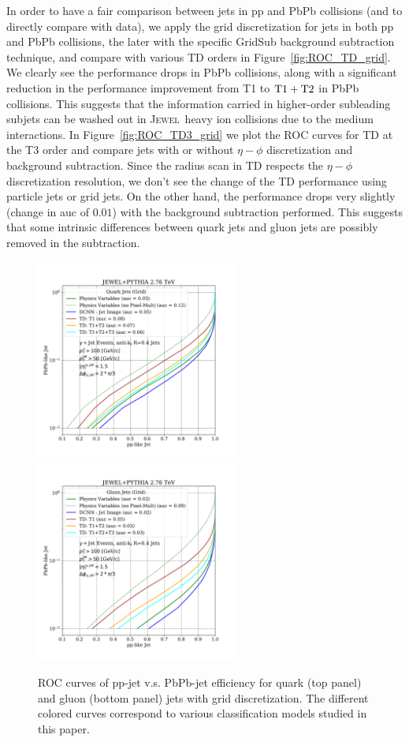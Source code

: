 \documentclass[notoc,preprintnumbers]{JHEP3}
\newcommand{\jw}{\textsc{Jewel}~}
\begin{document}
In order to have a fair comparison between jets in pp and PbPb collisions (and to directly compare with data), we apply the grid discretization for jets in both pp and PbPb collisions, the later with the specific GridSub background subtraction technique, and compare with various TD orders in Figure~\ref{fig:ROC_TD_grid}. We clearly see the performance drops in PbPb collisions, along with a significant reduction in the performance improvement from T1 to $\rm T1+T2$ in PbPb collisions. This suggests that the information carried in higher-order subleading subjets can be washed out in \jw heavy ion collisions due to the medium interactions. In Figure~\ref{fig:ROC_TD3_grid} we plot the ROC curves for TD at the T3 order and compare jets with or without $\eta-\phi$ discretization and background subtraction. Since the radius scan in TD respects the $\eta-\phi$ discretization resolution, we don't see the change of the TD performance using particle jets or grid jets. On the other hand, the performance drops very slightly (change in auc of $0.01$) with the background subtraction performed. This suggests that some intrinsic differences between quark jets and gluon jets are possibly removed in the subtraction.

\begin{figure}[t]
	   \centering
	   \includegraphics[width=0.59\textwidth]{plots/JEWELPYTHIA_2p76TeV_quark_ppvspbpb.pdf}
	   \includegraphics[width=0.59\textwidth]{plots/JEWELPYTHIA_2p76TeV_gluon_ppvspbpb.pdf}
	   \caption{ROC curves of pp-jet v.s. PbPb-jet efficiency for quark (top panel) and gluon (bottom panel) jets with grid discretization. The different colored curves correspond to various classification models studied in this paper.}
\label{fig:ROC_qq_gg}
\end{figure}
\end{document}
